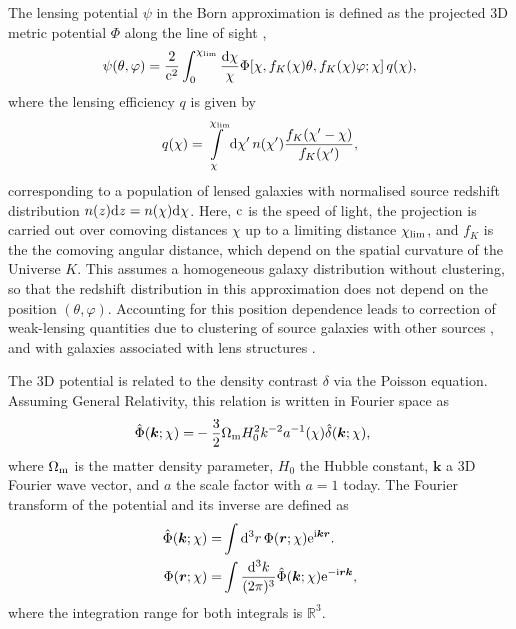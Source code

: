 \documentclass[fleqn,usenatbib]{mnras} %
\renewcommand{\vec}{\bm}
\begin{document}
The lensing potential $\psi$ in the Born approximation is defined as the
projected 3D metric potential $\Phi$ along the line of sight
\citep{1998ApJ...498...26K,BS01},
%
%
\begin{equation}
  \psi(\theta, \varphi) = \frac 2 {{\rm c}^2} \int_0^{\chi_{\rm lim}} \frac{{\rm d}\chi}{\chi}
    \Phi[\chi, f_K(\chi) \theta, f_K(\chi) \varphi; \chi] \, q(\chi),
  \label{eq:psi}
\end{equation}
%
where the lensing efficiency $q$ is given by
%
\begin{equation}
  q(\chi) = \int\limits_\chi^{\chi_{\rm lim}} {\rm d} \chi^\prime \, n(\chi^\prime)
    \frac{f_K(\chi^\prime - \chi)}{f_K(\chi^\prime)},
  \label{eq:lens_efficiency}
\end{equation}
%
corresponding to a population of lensed galaxies with normalised source redshift
distribution $n(z) {\rm d}z = n(\chi) {\rm d} \chi$. Here, ${\rm c}$ is the
speed of light, the projection is carried out over comoving distances $\chi$ up
to a limiting distance $\chi_{\rm lim}$, and $f_K$ is the the comoving angular
distance, which depend on the spatial curvature of the Universe $K$.
%
This assumes a homogeneous galaxy distribution without clustering, so that the
redshift distribution in this approximation does not depend on the position
$(\theta, \varphi)$. Accounting for this position dependence leads to
correction of weak-lensing quantities due to clustering of source galaxies with
other sources \citep{2002A&A...389..729S}, and with galaxies associated with
lens structures \citep{1998A&A...338..375B,H02}.

The 3D potential is related to the density contrast $\delta$ via the Poisson
equation. Assuming General Relativity, this relation is written in Fourier space as
%
\begin{align}
  \hat \Phi(\vec k; \chi) = & - \frac 3 2 \Omega_{\rm m} H_0^2 k^{-2} a^{-1}(\chi) \hat \delta(\vec k; \chi),
      \label{eq:poisson}
\end{align}
%
where $\Omega_{\rm m}$ is the matter density parameter, $H_0$ the Hubble constant, $\vec k$ a 3D Fourier wave
vector, and $a$ the scale factor with $a=1$ today.
The Fourier transform of the potential and its inverse are defined as
%
\begin{align}
  \hat \Phi(\vec k; \chi) = &  \int {\rm d}^3 r \, \Phi(\vec r; \chi) {\rm e}^{{\rm i} \vec k \vec r} .
  \label{eq:hatPhi}
  \\
  \Phi(\vec r; \chi) = &  \int \frac{{\rm d}^3 k}{(2\pi)^3}
      \hat \Phi(\vec k; \chi) {\rm e}^{-{\rm i} \vec r \vec k},
  \label{eq:hatPhi_inv}
\end{align}
%
where the integration range for both integrals is $\mathbb{R}^3$.
\end{document}
